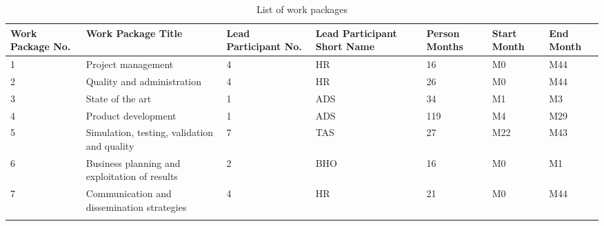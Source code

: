 \begin{longtable}[H]{p{1.3cm} p{2.1cm} p{1.8cm} p{2cm} p{1.9cm} p{1.6cm} p{1.3cm}}
	\toprule[2pt]
	
	\textbf{Work Package No.} & \textbf{Work Package Title} & \textbf{Lead Participant No.} & \textbf{Lead Participant Short Name} & \textbf{Person Months} & \textbf{Start Month} & \textbf{End Month} \\
	
	\midrule[1.5pt] 
	\endhead
	
	 1& Project management & 4 & HR & 16 & M0 & M44 \vspace{0.2cm} \\
	
	\midrule

	 2& Quality and administration & 4 & HR &  26 & M0 & M44 \vspace{0.2cm} \\
	
	\midrule
	
	 3& State of the art & 1 & ADS & 34 & M1 & M3 \vspace{0.2cm} \\

	\midrule

 	 4& Product development & 1 & ADS & 119 & M4 & M29 \vspace{0.2cm} \\
 	 
 	 \midrule
 	 
 	 5& Simulation, testing, validation and quality & 7 & TAS & 27 & M22  & M43 \vspace{0.2cm} \\
 	 
 	 \midrule
 	 
 	 6& Business planning and exploitation of results & 2 & BHO & 16 & M0 & M1 \vspace{0.2cm} \\
 	 
 	 \midrule
 	 
 	 7& Communication and dissemination strategies & 4 & HR & 21 & M0 & M44 \vspace{0.2cm} \\
	
	\bottomrule[2pt]
	
	\caption{List of work packages}
	\label{workpackages}
\end{longtable}





